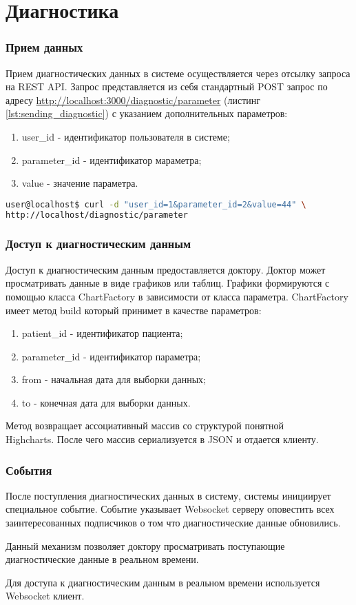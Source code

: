 \section{Диагностика}
\subsubsection{Прием данных}
Прием диагностических данных в системе осуществляется через отсылку запроса на
REST API. Запрос представляется из себя стандартный POST запрос по адресу
\url{http://localhost:3000/diagnostic/parameter} (листинг
\ref{lst:sending_diagnostic}) с указанием дополнительных параметров:
\begin{enumerate}
  \item user\_id - идентификатор пользователя в системе;
  \item parameter\_id - идентификатор мараметра;
  \item value - значение параметра.   
\end{enumerate}

\begin{lstlisting}[language=Bash,caption=Отправка диагностических данных
,label={lst:sending_diagnostic}] 
user@localhost$ curl -d "user_id=1&parameter_id=2&value=44" \
http://localhost/diagnostic/parameter
\end{lstlisting}

\subsubsection{Доступ к диагностическим данным}
Доступ к диагностическим данным предоставляется доктору. Доктор может
просматривать данные в виде графиков или таблиц. Графики формируются с помощью
класса ChartFactory в зависимости от класса параметра. ChartFactory имеет метод
build который принимет в качестве параметров:
\begin{enumerate}
  \item patient\_id - идентификатор пациента;
  \item parameter\_id - идентификатор параметра;
  \item from - начальная дата для выборки данных;
  \item to - конечная дата для выборки данных.
\end{enumerate}

Метод возвращает ассоциативный массив со структурой понятной \\ Highcharts.
После чего массив сериализуется в JSON и отдается клиенту.

\subsubsection{События}
После поступления диагностических данных в систему, системы инициирует
специальное событие. Событие указывает Websocket серверу оповестить всех
заинтересованных подписчиков о том что диагностические данные обновились.

Данный механизм позволяет доктору просматривать поступающие диагностические
данные в реальном времени.

Для доступа к диагностическим данным в реальном времени используется Websocket
клиент.